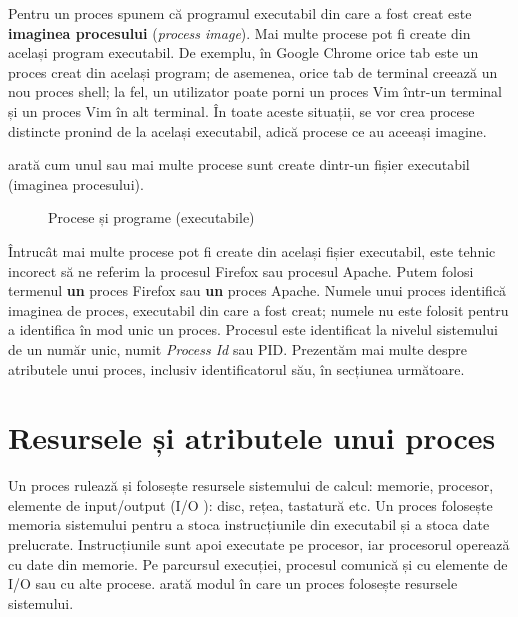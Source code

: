 Pentru un proces spunem că programul executabil din care a fost creat este \textbf{imaginea procesului} (\textit{process image}).
Mai multe procese pot fi create din același program executabil.
De exemplu, în Google Chrome orice tab este un proces creat din același program;
de asemenea, orice tab de terminal creează un nou proces shell;
la fel, un utilizator poate porni un proces Vim într-un terminal și un proces Vim în alt terminal.
În toate aceste situații, se vor crea procese distincte pronind de la același executabil, adică procese ce au aceeași imagine.

 arată cum unul sau mai multe procese sunt create dintr-un fișier executabil (imaginea procesului).

\begin{figure}[!htbp]
  \centering
  \def\svgwidth{0.7\textwidth}
  
  \caption{Procese și programe (executabile)}
  \label{fig:process:exec}
\end{figure}

Întrucât mai multe procese pot fi create din același fișier executabil, este tehnic incorect să ne referim la procesul Firefox sau procesul Apache.
Putem folosi termenul \textbf{un} proces Firefox sau \textbf{un} proces Apache.
Numele unui proces identifică imaginea de proces, executabil din care a fost creat;
numele nu este folosit pentru a identifica în mod unic un proces.
Procesul este identificat la nivelul sistemului de un număr unic, numit \textit{Process Id} sau PID.
Prezentăm mai multe despre atributele unui proces, inclusiv identificatorul său, în secțiunea următoare.

\section{Resursele și atributele unui proces}
\label{sec:process:resources}

Un proces rulează și folosește resursele sistemului de calcul: memorie, procesor, elemente de input/output (I/O ): disc, rețea, tastatură etc.
Un proces folosește memoria sistemului pentru a stoca instrucțiunile din executabil și a stoca date prelucrate.
Instrucțiunile sunt apoi executate pe procesor, iar procesorul operează cu date din memorie.
Pe parcursul execuției, procesul comunică și cu elemente de I/O sau cu alte procese.
 arată modul în care un proces folosește resursele sistemului.

